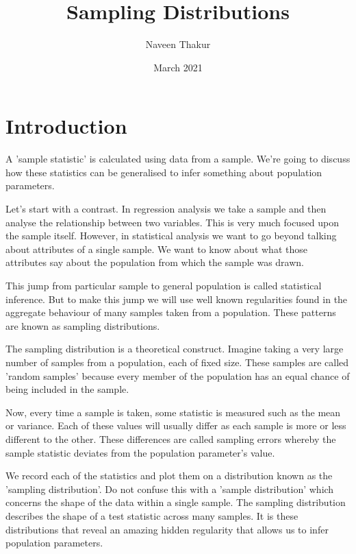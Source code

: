 \documentclass{article}
\title{Sampling Distributions}
\author{Naveen Thakur }
\date{March 2021}
\begin{document}
\maketitle

\section{Introduction}
A 'sample statistic' is calculated using data from a sample. We're going to discuss how these statistics can be generalised to infer something about population parameters.

Let's start with a contrast. In regression analysis we take a sample and then analyse the relationship between two variables. This is very much focused upon the sample itself. However, in statistical analysis we want to go beyond talking about attributes of a single sample. We want to know about what those attributes say about the population from which the sample was drawn.

This jump from particular sample to general population is called statistical inference. But to make this jump we will use well known regularities found in the aggregate behaviour of many samples taken from a population. These patterns are known as sampling distributions.

The sampling distribution is a theoretical construct. Imagine taking a very large number of samples from a population, each of fixed size. These samples are called 'random samples' because every member of the population has an equal chance of being included in the sample. 

Now, every time a sample is taken, some statistic is measured such as the mean or variance. Each of these values will usually differ as each sample is more or less different to the other. These differences are called sampling errors whereby the sample statistic deviates from the population parameter's value.

We record each of the statistics and plot them on a distribution known as the 'sampling distribution'. Do not confuse this with a 'sample distribution' which concerns the shape of the data within a single sample. The sampling distribution describes the shape of a test statistic across many samples. It is these distributions that reveal an amazing hidden regularity that allows us to infer population parameters.
\end{document}

